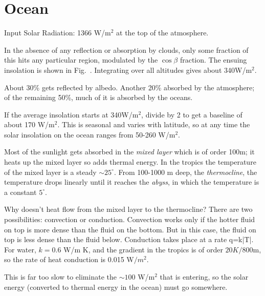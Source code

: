 \documentclass[11pt]{book}
\begin{document}
\section{Ocean}

\bei
\item Input Solar Radiation: 1366 W/m$^2$ at the top of the atmosphere.
\item In the absence of any reflection or absorption by clouds, only some fraction of this hits any particular region, modulated by the $\cos\beta$ fraction. The ensuing insolation is shown in Fig.~. Integrating over all altitudes gives about 340W/m$^2$. 
\item About 30\% gets reflected by albedo. Another 20\% absorbed by the atmosphere; of the remaining 50\%, much of it is absorbed by the oceans.
\item If the average insolation starts at 340W/m$^2$, divide by 2 to get a baseline of about 170 W/m$^2$. This is seasonal and varies with latitude, so at any time the solar insolation on the ocean ranges from 50-260 W/m$^2$.
\item Most of the sunlight gets absorbed in the {\it mixed layer} which is of order 100m; it heats up the mixed layer so adds thermal energy. In the tropics the temperature of the mixed layer is a steady $\sim25^\circ$. From 100-1000 m deep, the {\it thermocline}, the temperature drops linearly until it reaches the {\it abyss}, in which the temperature is a constant $5^\circ$.
\item Why doesn't heat flow from the mixed layer to the thermocline? There are two possibilities: convection or conduction. Convection works only if the hotter fluid on top is more dense than the fluid on the bottom. But in this case, the fluid on top is less dense than the fluid below. Conduction takes place at a rate
\be
q=k|\nabla T|.\ee
For water, $k=0.6$ W/m K, and the gradient in the tropics is of order $20 K/800$m, so the rate of heat conduction is 0.015 W$/m^2$. 
\item This is far too slow to eliminate the $\sim100$ W/m$^2$ that is entering, so the solar energy (converted to thermal energy in the ocean) must go somewhere.
\eei
\end{document}
